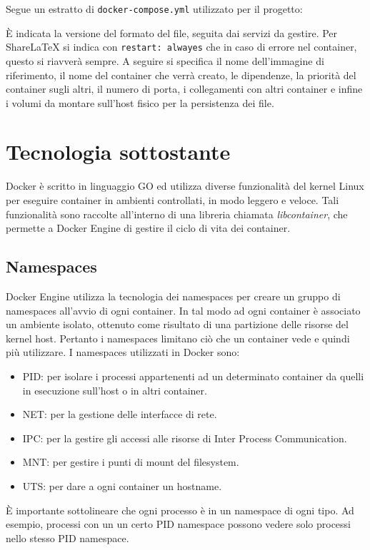 Segue un estratto di \verb|docker-compose.yml| utilizzato per il progetto:

È indicata la versione del formato del file, seguita dai servizi da gestire. Per ShareLaTeX si indica con \verb|restart: alwayes| che in caso di errore nel container, questo si riavverà sempre. A seguire si specifica il nome dell'immagine di riferimento, il nome del container che verrà creato, le dipendenze, la priorità del container sugli altri, il numero di porta, i collegamenti con altri container e infine i volumi da montare sull'host fisico per la persistenza dei file.
 
\section{Tecnologia sottostante}
Docker è scritto in linguaggio GO ed utilizza diverse funzionalità del kernel Linux per eseguire container in ambienti controllati, in modo leggero e veloce. Tali funzionalità sono raccolte all'interno di una libreria chiamata \emph{libcontainer}, che permette a Docker Engine di gestire il ciclo di vita dei container.

\subsection{Namespaces}
Docker Engine utilizza la tecnologia dei namespaces per creare un gruppo di namespaces all'avvio di ogni container. In tal modo ad ogni container è associato un ambiente isolato, ottenuto come risultato di una partizione delle risorse del kernel host. Pertanto i namespaces limitano ciò che un container vede e quindi più utilizzare. I namespaces utilizzati in Docker sono:
\begin{itemize}
    \item PID: per isolare i processi appartenenti ad un determinato container da quelli in esecuzione sull'host o in altri container.
    \item NET: per la gestione delle interfacce di rete.
    \item IPC: per la gestire gli accessi alle risorse di Inter Process Communication.
    \item MNT: per gestire i punti di mount del filesystem.
    \item UTS: per dare a ogni container un hostname.
\end{itemize}
È importante sottolineare che ogni processo è in un namespace di ogni tipo. Ad esempio, processi con un un certo PID namespace possono vedere solo processi nello stesso PID namespace.

